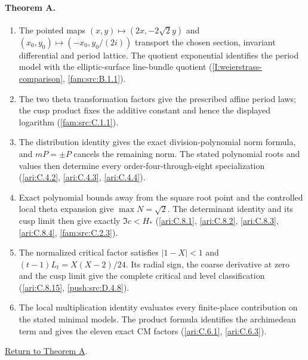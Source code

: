 \paragraph{Theorem A.}
\begin{enumerate}[label=\arabic*.]
\item\hypertarget{step-I-A-1}{} The pointed maps
$(x,y)\mapsto(2x,-2\sqrt2y)$ and
$(x_0,y_0)\mapsto(-x_0,y_0/(2i))$ transport the chosen section,
invariant differential and period lattice.  The quotient
exponential identifies the period model with the elliptic-surface
line-bundle quotient
(\hyperref[I:weierstrass-comparison]{\ref*{I:weierstrass-comparison}},
\hyperref[fam:src:B.1.1]{\ref*{fam:src:B.1.1}}).
\item\hypertarget{step-I-A-2}{} The two theta transformation
factors give the prescribed affine period laws; the cusp product
fixes the additive constant and hence the displayed logarithm
(\hyperref[fam:src:C.1.1]{\ref*{fam:src:C.1.1}}).
\item\hypertarget{step-I-A-3}{} The distribution identity gives
the exact division-polynomial norm formula, and $mP=\pm P$
cancels the remaining norm.  The stated polynomial roots and
values then determine every order-four-through-eight
specialization
(\hyperref[ari:C.4.2]{\ref*{ari:C.4.2}},
\hyperref[ari:C.4.3]{\ref*{ari:C.4.3}},
\hyperref[ari:C.4.4]{\ref*{ari:C.4.4}}).
\item\hypertarget{step-I-A-4}{} Exact polynomial bounds away
from the square root point and the controlled local theta
expansion give $\max N=\sqrt2$.  The determinant identity and
its cusp limit then give exactly $\Im c<H_*$
(\hyperref[ari:C.8.1]{\ref*{ari:C.8.1}},
\hyperref[ari:C.8.2]{\ref*{ari:C.8.2}},
\hyperref[ari:C.8.3]{\ref*{ari:C.8.3}},
\hyperref[ari:C.8.4]{\ref*{ari:C.8.4}},
\hyperref[fam:src:C.2.3]{\ref*{fam:src:C.2.3}}).
\item\hypertarget{step-I-A-5}{} The normalized critical factor
satisfies $|1-X|<1$ and
$(t-1)L_t=X(X-2)/24$.  Its radial sign, the coarse derivative
at zero and the cusp limit give the complete critical and level
classification
(\hyperref[ari:C.8.15]{\ref*{ari:C.8.15}},
\hyperref[push:src:D.4.8]{\ref*{push:src:D.4.8}}).
\item\hypertarget{step-I-A-6}{} The local multiplication identity
evaluates every finite-place contribution on the stated minimal
models.  The product formula identifies the archimedean term and
gives the eleven exact CM factors
(\hyperref[ari:C.6.1]{\ref*{ari:C.6.1}},
\hyperref[ari:C.6.3]{\ref*{ari:C.6.3}}).
\end{enumerate}
\hyperlink{main-I-A}{Return to Theorem A}.

